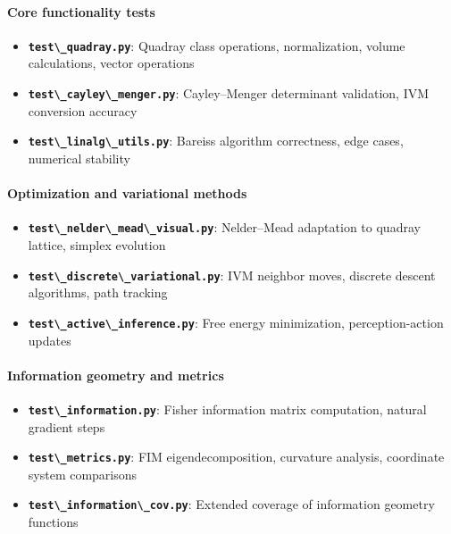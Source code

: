 \documentclass[
  10pt,
]{article}
\newcommand{\passthrough}[1]{#1}
\providecommand{\tightlist}{%
  \setlength{\itemsep}{0pt}\setlength{\parskip}{0pt}}
\begin{document}
\hypertarget{core-functionality-tests}{%
\paragraph{Core functionality tests}\label{core-functionality-tests}}

\begin{itemize}
\tightlist
\item
  \textbf{\passthrough{\lstinline!test\_quadray.py!}}: Quadray class
  operations, normalization, volume calculations, vector operations
\item
  \textbf{\passthrough{\lstinline!test\_cayley\_menger.py!}}:
  Cayley--Menger determinant validation, IVM conversion accuracy
\item
  \textbf{\passthrough{\lstinline!test\_linalg\_utils.py!}}: Bareiss
  algorithm correctness, edge cases, numerical stability
\end{itemize}

\hypertarget{optimization-and-variational-methods}{%
\paragraph{Optimization and variational
methods}\label{optimization-and-variational-methods}}

\begin{itemize}
\tightlist
\item
  \textbf{\passthrough{\lstinline!test\_nelder\_mead\_visual.py!}}:
  Nelder--Mead adaptation to quadray lattice, simplex evolution
\item
  \textbf{\passthrough{\lstinline!test\_discrete\_variational.py!}}: IVM
  neighbor moves, discrete descent algorithms, path tracking
\item
  \textbf{\passthrough{\lstinline!test\_active\_inference.py!}}: Free
  energy minimization, perception-action updates
\end{itemize}

\hypertarget{information-geometry-and-metrics}{%
\paragraph{Information geometry and
metrics}\label{information-geometry-and-metrics}}

\begin{itemize}
\tightlist
\item
  \textbf{\passthrough{\lstinline!test\_information.py!}}: Fisher
  information matrix computation, natural gradient steps
\item
  \textbf{\passthrough{\lstinline!test\_metrics.py!}}: FIM
  eigendecomposition, curvature analysis, coordinate system comparisons
\item
  \textbf{\passthrough{\lstinline!test\_information\_cov.py!}}: Extended
  coverage of information geometry functions
\end{itemize}
\end{document}

